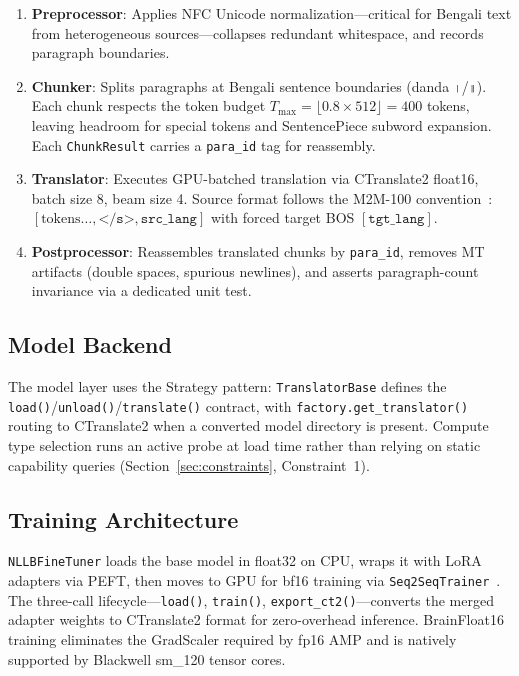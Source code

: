 \documentclass[journal]{IEEEtran}
\begin{document}
\begin{enumerate}
  \item \textbf{Preprocessor}: Applies NFC Unicode normalization---critical for
        Bengali text from heterogeneous sources---collapses redundant whitespace,
        and records paragraph boundaries.

  \item \textbf{Chunker}: Splits paragraphs at Bengali sentence boundaries
        (danda \texttt{।}/\texttt{॥}).
        Each chunk respects the token budget
        $T_{\max} = \lfloor 0.8 \times 512 \rfloor = 400$ tokens, leaving headroom
        for special tokens and SentencePiece subword expansion.
        Each \texttt{ChunkResult} carries a \texttt{para\_id} tag for reassembly.

  \item \textbf{Translator}: Executes GPU-batched translation via CTranslate2
        float16, batch size 8, beam size 4.
        Source format follows the M2M-100 convention~\cite{fan2021beyond}:
        $[\text{tokens}\ldots, \texttt{</s>}, \texttt{src\_lang}]$
        with forced target BOS $[\texttt{tgt\_lang}]$.

  \item \textbf{Postprocessor}: Reassembles translated chunks by \texttt{para\_id},
        removes MT artifacts (double spaces, spurious newlines), and asserts
        paragraph-count invariance via a dedicated unit test.
\end{enumerate}

\subsection{Model Backend}

The model layer uses the Strategy pattern: \texttt{TranslatorBase} defines the
\texttt{load()}/\texttt{unload()}/\texttt{translate()} contract, with
\texttt{factory.get\_translator()} routing to CTranslate2 when a converted model
directory is present.
Compute type selection runs an active probe at load time rather than relying on
static capability queries (Section~\ref{sec:constraints}, Constraint~1).

\subsection{Training Architecture}

\texttt{NLLBFineTuner} loads the base model in float32 on CPU, wraps it with LoRA
adapters via PEFT, then moves to GPU for bf16 training via
\texttt{Seq2SeqTrainer}~\cite{wolf2020transformers}.
The three-call lifecycle---\texttt{load()}, \texttt{train()}, \texttt{export\_ct2()}---converts
the merged adapter weights to CTranslate2 format for zero-overhead inference.
BrainFloat16~\cite{micikevicius2018mixed} training eliminates the GradScaler
required by fp16 AMP and is natively supported by Blackwell sm\_120 tensor cores.
\end{document}
